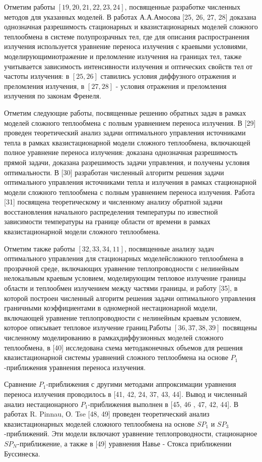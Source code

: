 \documentclass[10pt]{article}
\begin{document}
Отметим работы $[19,20,21,22,23,24]$, посвященные разработке численных методов для указанных моделей. В работах А.А.Амосова [25, 26, 27, 28] доказана однозначная разрешимость стационарных и квазистационарных моделей сложного теплообмена в системе полупрозрачных тел, где для описания распространения излучения используется уравнение переноса излучения с краевыми условиями, моделирующимиотражение и преломление излучения на границах тел, также учитывается зависимость интенсивности излучения и оптических свойств тел от частоты излучения: в $[25,26]$ ставились условия диффузного отражения и преломления излучения, в $[27,28]$ - условия отражения и преломления излучения по законам Френеля.

Отметим следующие работы, посвященные решению обратных задач в рамках моделей сложного теплообмена с полным уравнением переноса излучения. В [29] проведен теоретический анализ задачи оптимального управления источниками тепла в рамках квазистационарной модели сложного теплообмена, включающей полное уравнение переноса излучения: доказана однозначная разрешимость прямой задачи, доказана разрешимость задачи управления, и получены условия оптимальности. В [30] разработан численный алгоритм решения задачи оптимального управления источниками тепла и излучения в рамках стационарной модели сложного теплообмена с полным уравнением переноса излучения. Работа [31] посвящена теоретическому и численному анализу обратной задачи восстановления начального распределения температуры по известной зависимости температуры на границе области от времени в рамках квазистационарной модели сложного теплообмена.

Отметим также работы $[32,33,34,11]$, посвященные анализу задач оптимального управления для стационарных моделейсложного теплообмена в прозрачной среде, включающих уравнение теплопроводности с нелинейным нелокальным краевым условием, моделирующим тепловое излучение границы области и теплообмен излучением между частями границы, и работу [35], в которой построен численный алгоритм решения задачи оптимального управления граничными коэффициентами в одномерной нестационарной модели, включающей уравнение теплопроводности с нелинейным краевым условием, которое описывает тепловое излучение границ.Работы $[36,37,38,39]$ посвящены численному моделированию в рамкахдиффузионных моделей сложного теплообмена, в [40] исследована схема методаконечных объемов для решения квазистационарной системы уравнений сложного теплообмена на основе $P_{1}$-приближения уравнения переноса излучения.

Сравнение $P_{1}$-приближения с другими методами аппроксимации уравнения переноса излучения проводилось в [41, 42, 24, 37, 43, 44]. Вывод и численный анализ нестационарного $P_{1}$-приближения выполнен в [45, 46 , 47, 42, 44]. В работах R. Pinnau, О. Tse [48, 49] проведен теоретический анализ квазистационарных моделей сложного теплообмена на основе $S P_{1}$ и $S P_{3}$-приближений. Эти модели включают уравнение теплопроводности, стационарное $S P_{N}$-приближение, а также в [49] уравнения Навье - Стокса приближении Буссинеска.
\end{document}
